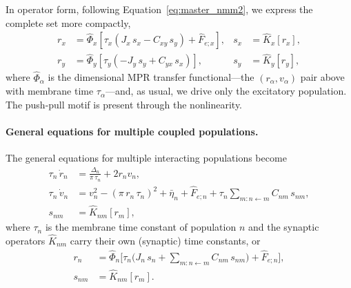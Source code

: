 \documentclass[11pt]{article}
\numberwithin{equation}{section}
\begin{document}
In operator form, following Equation~\ref{eq:master_nmm2}, we express the complete set more compactly,
\begin{equation}
\begin{aligned}
     r_x &=  \hat \Phi_x\!\left[\tau_x\!\left(J_x\, s_x - C_{xy}\, s_y\right) + \hat F_{e;x}\right], &
 s_x &= \hat K_x [r_x], \\
  r_y &=  \hat \Phi_y\!\left[\tau_y\!\left(-J_y\, s_y + C_{yx}\, s_x\right)\right], &
 s_y &= \hat K_y[r_y],
\end{aligned}
\end{equation}
where $\hat\Phi_\alpha$ is the dimensional MPR transfer functional---the $(r_\alpha,v_\alpha)$ pair above with membrane time $\tau_\alpha$---and, as usual, we drive only the excitatory population. The push-pull motif is present through the nonlinearity.
\paragraph{General equations for multiple coupled populations.} The general equations for multiple interacting populations become 
\begin{equation}
\begin{aligned} \label{eq:nmm2-general}
\tau_n\,\dot r_n &= \frac{\Delta_n}{\pi\,\tau_n} + 2 r_n v_n, \\
\tau_n\,\dot v_n &= v_n^2 - \left(\pi\, r_n\, \tau_n\right)^2 + \bar\eta_n + \hat F_{e;n}
 + \tau_n\!\!\sum_{m:n\leftarrow m} C_{nm}\, s_{nm}, \\
s_{nm} &= \hat K_{nm}[r_m],
\end{aligned}
\end{equation}
where $\tau_n$ is the membrane time constant of population $n$ and the synaptic operators $\hat K_{nm}$ carry their own (synaptic) time constants, or
\begin{equation}
\begin{aligned}
 r_n &= \hat\Phi_n\!\Big[\tau_n\Big(J_n\, s_n + \!\!\sum_{m:n\leftarrow m} C_{nm}\, s_{nm}\Big) + \hat F_{e;n}\Big], \\
 s_{nm} &= \hat K_{nm}[r_m] .
\end{aligned}
\end{equation}
\end{document}
